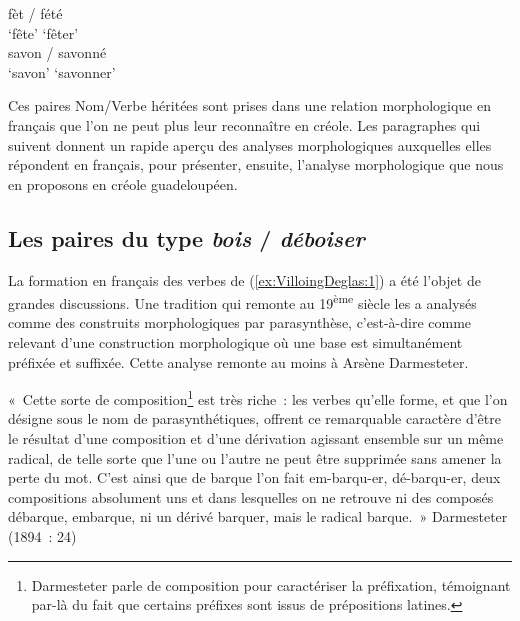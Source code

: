 \documentclass[output=paper]{langsci/langscibook}
\begin{document}
  \ex \gll fèt / fété\\
  `fête' {} `fêter'\\

  \ex \gll savon / savonné\\
  `savon' {} `savonner'\\
\z\z

Ces paires Nom/Verbe héritées sont prises dans une relation
morphologique en français que l'on ne peut plus leur reconnaître en
créole. Les paragraphes qui suivent donnent un rapide aperçu des
analyses morphologiques auxquelles elles répondent en français, pour
présenter, ensuite, l'analyse morphologique que nous en proposons en
créole guadeloupéen.

\subsection{Les paires du type \emph{bois} / \emph{déboiser}}\label{subsection:VilloingDeglas:les-paires-du-type-bois-déboiser}

La formation en français des verbes de (\ref{ex:VilloingDeglas:1}) a été l'objet de grandes
discussions. Une tradition qui remonte au 19\textsuperscript{ème} siècle
les a analysés comme des construits morphologiques par parasynthèse,
c'est-à-dire comme relevant d'une construction morphologique où une base
est simultanément préfixée et suffixée. Cette analyse remonte au moins à
Arsène Darmesteter.

«~Cette sorte de composition\footnote{Darmesteter parle
  de composition pour caractériser la préfixation, témoignant par-là du
  fait que certains préfixes sont issus de prépositions latines.} est
très riche~: les verbes qu'elle forme, et que l'on désigne sous le nom
de parasynthétiques, offrent ce remarquable caractère d'être le résultat
d'une composition et d'une dérivation agissant ensemble sur un même
radical, de telle sorte que l'une ou l'autre ne peut être supprimée sans
amener la perte du mot. C'est ainsi que de barque l'on fait em-barqu-er,
dé-barqu-er, deux compositions absolument uns et dans lesquelles on ne
retrouve ni des composés débarque, embarque, ni un dérivé barquer, mais
le radical barque.~» Darmesteter (1894~: 24)
\end{document}
